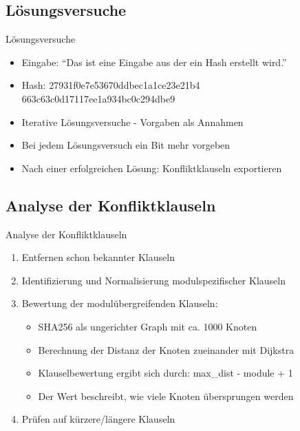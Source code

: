 \documentclass{beamer}
\begin{document}
  \subsection{Lösungsversuche}
    \begin{frame}{Lösungsversuche}
      \begin{itemize}
        \setlength{\itemsep}{20pt}
        \item Eingabe: "`Das ist eine Eingabe aus der ein Hash erstellt wird."'
        \item Hash:\newline
              27931f0e7e53670ddbec1a1ce23e21b4\newline
              663c63c0d17117ee1a934bc0c294dbe9
        \item Iterative Lösungsversuche - Vorgaben als Annahmen
        \item Bei jedem Lösungsversuch ein Bit mehr vorgeben
        \item Nach einer erfolgreichen Lösung: Konfliktklauseln exportieren
      \end{itemize}
    \end{frame}
  \subsection{Analyse der Konfliktklauseln}
    \begin{frame}{Analyse der Konfliktklauseln}
      \begin{enumerate}
        \setlength{\itemsep}{20pt}
        \item Entfernen schon bekannter Klauseln
        \pause
        \item Identifizierung und Normalisierung modulspezifischer Klauseln
        \pause
        \item Bewertung der modulübergreifenden Klauseln:
        \begin{itemize}
          \item SHA256 als ungerichter Graph mit ca. 1000 Knoten
          \item Berechnung der Distanz der Knoten zueinander mit Dijkstra
          \item Klauselbewertung ergibt sich durch: max\_dist - module + 1
          \item Der Wert beschreibt, wie viele Knoten übersprungen werden
        \end{itemize}
        \pause
        \item Prüfen auf kürzere/längere Klauseln
      \end{enumerate}
    \end{frame}
\end{document}
